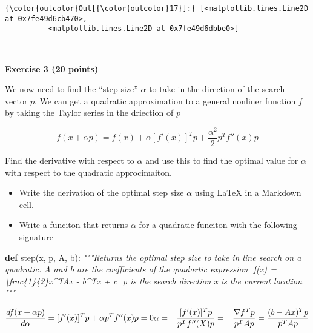 \documentclass[11pt]{article}
\providecommand{\tightlist}{%
      \setlength{\itemsep}{0pt}\setlength{\parskip}{0pt}}
\newenvironment{Shaded}{}{}
\newcommand{\KeywordTok}[1]{\textcolor[rgb]{0.00,0.44,0.13}{\textbf{{#1}}}}
\newcommand{\CommentTok}[1]{\textcolor[rgb]{0.38,0.63,0.69}{\textit{{#1}}}}
\newcommand{\NormalTok}[1]{{#1}}
\begin{document}
\begin{Verbatim}[commandchars=\\\{\}]
{\color{outcolor}Out[{\color{outcolor}17}]:} [<matplotlib.lines.Line2D at 0x7fe49d6cb470>,
          <matplotlib.lines.Line2D at 0x7fe49d6dbbe0>]
\end{Verbatim}
            
    \begin{center}
    \end{center}
    { \hspace*{\fill} \\}
    
    \textbf{Exercise 3 (20 points)}

We now need to find the ``step size'' \(\alpha\) to take in the
direction of the search vector \(p\). We can get a quadratic
approximation to a general nonliner function \(f\) by taking the Taylor
series in the driection of \(p\)

\[
f(x + \alpha p) = f(x) + \alpha [f'(x)]^T p + \frac{\alpha^2}{2} p^T f''(x) p
\]

Find the derivative with respect to \(\alpha\) and use this to find the
optimal value for \(\alpha\) with respect to the quadratic
approcimaiton.

\begin{itemize}
\tightlist
\item
  Write the derivation of the optimal step size \(\alpha\) using LaTeX
  in a Markdown cell.
\item
  Write a funciton that returns \(\alpha\) for a quadratic funciton with
  the following signature
\end{itemize}

\begin{Shaded}
\begin{Highlighting}[]
\KeywordTok{def}\NormalTok{ step(x, p, A, b):}
    \CommentTok{"""Returns the optimal step size to take in line search on a quadratic.}
\CommentTok{    }
\CommentTok{    A and b are the coefficients of the quadartic expression }
\CommentTok{    $$}
\CommentTok{    f(x) = \textbackslash{}frac\{1\}\{2\}x^TAx - b^Tx + c}
\CommentTok{    $$}
\CommentTok{    p is the search direction}
\CommentTok{    x is the current location}
\CommentTok{    """}
\end{Highlighting}
\end{Shaded}

    \[\frac{df(x+\alpha p)}{d\alpha} = [f'(x)]^Tp + \alpha p^Tf''(x)p = 0 \\
\alpha = -\frac{[f'(x)]^Tp}{p^Tf''(X)p} =  - \frac{\nabla f^T p}{p^T A p} 
= \frac{(b - Ax)^T p}{p^T A p}
\]
\end{document}
